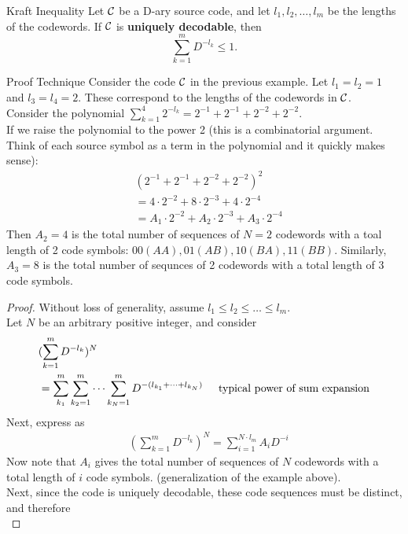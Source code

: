 \documentclass[../main.tex]{subfiles}
\begin{document}
\begin{bbox}{Kraft Inequality}
Let $\mathcal{C}$ be a D-ary source code, and let $l_1,l_2,\dots,l_m$ be the lengths of the codewords. If $\mathcal{C}$ is \textbf{uniquely decodable}, then \begin{equation*}
    \sum_{k=1}^{m}D^{-l_k} \leq 1.
\end{equation*}    
\begin{pbox}{Proof Technique}
    Consider the code $\mathcal{C}$ in the previous example. Let $l_1=l_2=1$ and $l_3=l_4=2$. These correspond to the lengths of the codewords in $\mathcal{C}$.\\
    Consider the polynomial $\sum_{k=1}^{4}2^{-l_k}=2^{-1}+2^{-1}+2^{-2}+2^{-2}$.\\
    If we raise the polynomial to the power 2 (this is a combinatorial argument. Think of each source symbol as a term in the polynomial and it quickly makes sense): \begin{align*}
        &(2^{-1}+2^{-1}+2^{-2}+2^{-2})^2\\
        &= 4\cdot 2^{-2} + 8\cdot 2^{-3} + 4\cdot 2^{-4}\\
        &=A_1\cdot 2^{-2} + A_2\cdot 2^{-3} + A_3\cdot 2^{-4}
    \end{align*}
    Then $A_2=4$ is the total number of sequences of $N=2$ codewords with a toal length of 2 code symbols: $00(AA), 01(AB), 10(BA), 11(BB).$
    Similarly, $A_3=8$ is the total number of sequnces of 2 codewords with a total length of 3 code symbols.
\end{pbox}
\begin{proof}
    Without loss of generality, assume $l_1\leq l_2\leq\dots\leq l_m$.\\
    Let $N$ be an arbitrary positive integer, and consider \begin{align*}
        &(\sum_{k=1}^{m}D^{-l_k})^N\\
        &= \sum_{k_1}^m\sum_{k_2=1}^{m}\dots\sum_{k_N=1}^{m}D^{-(l_{k_1}+\dots+l_{k_N})} \hspace{5mm} \text{typical power of sum expansion}
    \end{align*}
    Next, express as \begin{align*}
        &(\sum_{k=1}^{m}D^{-l_k})^N = \sum_{i=1}^{N\cdot l_m}A_i D^{-i}
    \end{align*}
    Now note that $A_i$ gives the total number of sequences of $N$ codewords with a total length of $i$ code symbols. (generalization of the example above).\\
    Next, since the code is uniquely decodable, these code sequences must be distinct, and therefore \begin{equation*}

\end{equation*}
\end{proof}
\end{bbox}
\end{document}
